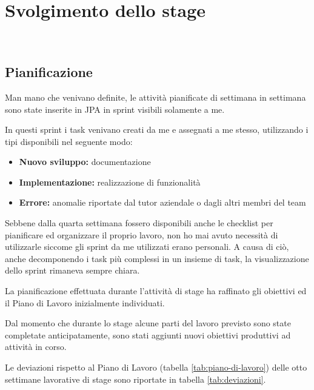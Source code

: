 
\chapter{Svolgimento dello stage}
\label{cap:progetto}

\\

\section{Pianificazione}

Man mano che venivano definite, le attività pianificate di settimana in
settimana sono state inserite in JPA in sprint visibili solamente a me.

In questi sprint i task venivano creati da me e assegnati a me stesso,
utilizzando i tipi disponibili nel seguente modo:

\begin{itemize}
\item \textbf{Nuovo sviluppo:} documentazione
\item \textbf{Implementazione:} realizzazione di funzionalità
\item \textbf{Errore:} anomalie riportate dal tutor aziendale o dagli altri
  membri del team
\end{itemize}

Sebbene dalla quarta settimana fossero disponibili anche le checklist per
pianificare ed organizzare il proprio lavoro, non ho mai avuto necessità di
utilizzarle siccome gli sprint da me utilizzati erano personali. A causa
di ciò, anche decomponendo i task più complessi in un insieme di task, la
visualizzazione dello sprint rimaneva sempre chiara.

La pianificazione effettuata durante l'attività di stage ha raffinato gli
obiettivi ed il Piano di Lavoro inizialmente individuati.

Dal momento che durante lo stage alcune parti del lavoro previsto sono state
completate anticipatamente, sono stati aggiunti nuovi obiettivi produttivi ad
attività in corso.

Le deviazioni rispetto al Piano di Lavoro (tabella \ref{tab:piano-di-lavoro})
delle otto settimane lavorative di stage sono riportate in tabella
\ref{tab:deviazioni}.

